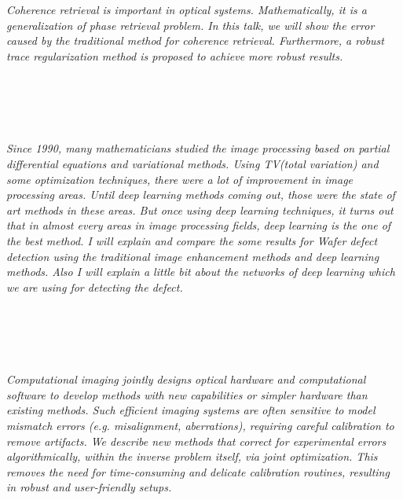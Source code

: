   \begin{multicols}{2}
      \textit{Coherence retrieval is important in optical systems. Mathematically, it is a generalization of phase retrieval problem. In this talk, we will show the error caused by the traditional method for coherence retrieval. Furthermore, a robust trace regularization method is proposed to achieve more robust results.}\\
\\ 
        \\
        \\\\
\\
      \textit{Since 1990, many mathematicians studied the image processing based on partial differential equations and variational methods. Using TV(total variation) and some optimization techniques, there were a lot of improvement in image processing areas. Until deep learning methods coming out, those were the state of art methods in these areas. But once using deep learning techniques, it turns out that in almost every areas in image processing fields, deep learning is the one of the best method. I will explain and compare the some results for Wafer defect detection using the traditional image enhancement methods and deep learning methods. Also I will explain a little bit about the networks of deep learning which we are using for detecting the defect.}\\
\\ 
        \\
        \\\\
\\
      \textit{Computational imaging jointly designs optical hardware and computational software to develop methods with new capabilities or simpler hardware than existing methods. Such efficient imaging systems are often sensitive to model mismatch errors (e.g. misalignment, aberrations), requiring careful calibration to remove artifacts. We describe new methods that correct for experimental errors algorithmically, within the inverse problem itself, via joint optimization. This removes the need for time-consuming and delicate calibration routines, resulting in robust and user-friendly setups.}\\
\\ 
        \\
        \\\\

\end{multicols}
